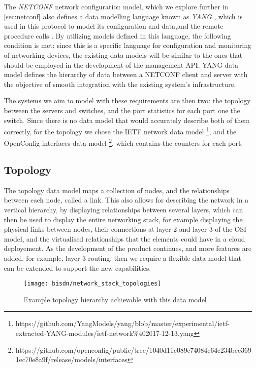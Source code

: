 \par The \textit{ NETCONF } network configuration model, which we explore further in \ref{sec:netconf} also defines a data modelling language known as \textit{ YANG }, which is used in this protocol to model its configuration 
and data,and the remote procedure calls \cite { CITE - rfc 6020 }. By utilizing models defined in this language, the following condition is met: since this is a specific language for configuration and monitoring of networking 
devices, the existing data models will be similar to the ones that should be employed in the development of the management API. YANG data model defines the hierarchy of data between a NETCONF client and server with the objective
of smooth integration with the existing system's infrastructure. 

\par The systems we aim to model with these requirements are then two: the topology between the servers and switches, and the port statistics for each port one the switch. Since there is no data model that would accurately describe
both of them correctly, for the topology we chose the IETF network data model \footnote {https://github.com/YangModels/yang/blob/master/experimental/ietf-extracted-YANG-modules/ietf-network\%402017-12-13.yang}, and the 
OpenConfig interfaces data model \footnote {https://github.com/openconfig/public/tree/1040d11c089c74084c64c234bee3691ec70e8a9f/release/models/interfaces}, which contains the counters for each port.

\subsection {Topology}

The topology data model maps a collection of nodes, and the relationships between each node, called a link. This also allows for describing the network in a vertical hierarchy, by displaying relationships between several layers,
which can then be used to display the entire networking stack, for example displaying the physical links between nodes, their connections at layer 2 and layer 3 of the OSI model, and the virtualised relationships that the elements 
could have in a cloud deployement. As the development of the product continues, and more features are added, for example, layer 3 routing, then we require a flexible data model that can be extended to support the new capabilities.

\begin{figure} [!htbp]
    \centering
    \texttt{[image: bisdn/network\_stack\_topologies]}
    \caption{Example topology hierarchy achievable with this data model \cite {CITE - https://www.ietf.org/id/draft-ietf-i2rs-yang-network-topo-20.txt}}
\end{figure}

